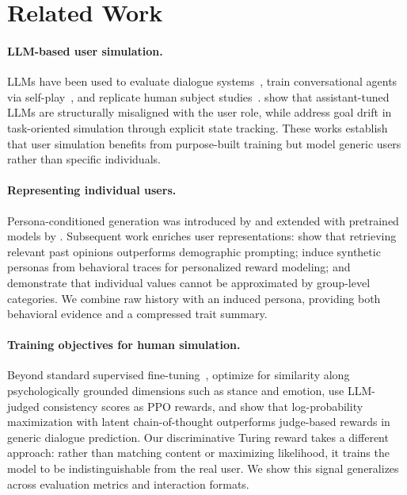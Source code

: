 \documentclass{article}
\begin{document}
\section{Related Work}
 
\paragraph{LLM-based user simulation.}
LLMs have been used to evaluate dialogue systems~\citep{davidson2023user, sekulic2024simulating}, train conversational agents via self-play~\citep{shah2018bootstrapping, abdulhai2025consistently}, and replicate human subject studies~\citep{aher2023simulating, park2023generative}. \citet{naous2025flipping} show that assistant-tuned LLMs are structurally misaligned with the user role, while \citet{mehri2025goal} address goal drift in task-oriented simulation through explicit state tracking. These works establish that user simulation benefits from purpose-built training but model generic users rather than specific individuals.
 
\paragraph{Representing individual users.}
Persona-conditioned generation was introduced by \citet{zhang2018personalizing} and extended with pretrained models by \citet{wolf2019transfertransfo}. Subsequent work enriches user representations: \citet{hwang2023aligning} show that retrieving relevant past opinions outperforms demographic prompting; \citet{ryan2025synthesizeme} induce synthetic personas from behavioral traces for personalized reward modeling; and \citet{jiang2024indievalue} demonstrate that individual values cannot be approximated by group-level categories. We combine raw history with an induced persona, providing both behavioral evidence and a compressed trait summary.
 
\paragraph{Training objectives for human simulation.}
Beyond standard supervised fine-tuning~\citep{wolf2019transfertransfo}, \citet{wu2026humanlm} optimize for similarity along psychologically grounded dimensions such as stance and emotion, \citet{abdulhai2025consistently} use LLM-judged consistency scores as PPO rewards, and \citet{gandhi2026dialogue} show that log-probability maximization with latent chain-of-thought outperforms judge-based rewards in generic dialogue prediction. Our discriminative Turing reward takes a different approach: rather than matching content or maximizing likelihood, it trains the model to be indistinguishable from the real user. We show this signal generalizes across evaluation metrics and interaction formats.
\end{document}
